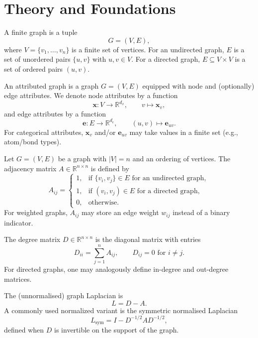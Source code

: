 \chapter{Theory and Foundations}
\begin{definition}[Graph]
A finite graph is a tuple
\[
G=(V,E),
\]
where \(V=\{v_1,\dots,v_n\}\) is a finite set of vertices. For an undirected
graph, \(E\) is a set of unordered pairs \(\{u,v\}\) with \(u,v\in V\). For a
directed graph, \(E\subseteq V\times V\) is a set of ordered pairs
\((u,v)\).
\end{definition}

\begin{definition}
An attributed graph is a graph \(G=(V,E)\) equipped with node and (optionally) edge attributes.
We denote node attributes by a function
\[
\mathbf{x}: V \to \mathbb{R}^{d_x}, \qquad v \mapsto \mathbf{x}_v,
\]
and edge attributes by a function
\[
\mathbf{e}: E \to \mathbb{R}^{d_e}, \qquad (u,v) \mapsto \mathbf{e}_{uv}.
\]
For categorical attributes, \(\mathbf{x}_v\) and/or \(\mathbf{e}_{uv}\) may take values in a finite set (e.g., atom/bond types).
\end{definition}

\begin{definition}
Let \(G=(V,E)\) be a graph with \(|V|=n\) and an ordering of vertices.
The adjacency matrix \(A \in \mathbb{R}^{n \times n}\) is defined by
\[
A_{ij} =
\begin{cases}
1, & \text{if } \{v_i,v_j\}\in E \text{ for an undirected graph},\\
1, & \text{if } (v_i,v_j)\in E \text{ for a directed graph},\\
0, & \text{otherwise.}
\end{cases}
\]
For weighted graphs, \(A_{ij}\) may store an edge weight \(w_{ij}\) instead of a binary indicator.
\end{definition}

\begin{definition}
The degree matrix \(D \in \mathbb{R}^{n \times n}\) is the diagonal matrix with entries
\[
D_{ii} = \sum_{j=1}^n A_{ij}, \qquad D_{ij}=0 \text{ for } i \neq j.
\]
For directed graphs, one may analogously define in-degree and out-degree matrices.
\end{definition}

\begin{definition}
The (unnormalised) graph Laplacian is
\[
L = D - A.
\]
A commonly used normalized variant is the symmetric normalised Laplacian
\[
L_{\mathrm{sym}} = I - D^{-1/2} A D^{-1/2},
\]
defined when \(D\) is invertible on the support of the graph.
\end{definition}
